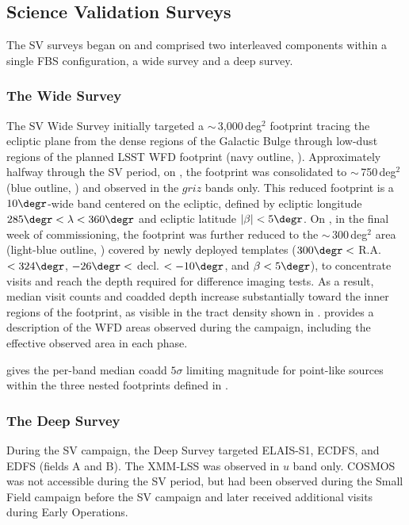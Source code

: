 \subsection{Science Validation Surveys}
\label{ssec:sv_surveys}
%
The \gls{SV} surveys began on \svcampaignstartdate and comprised two interleaved components within a single \gls{FBS} \gls{configuration}, a wide survey and a deep survey.

\subsubsection{The Wide Survey}
The SV Wide Survey initially targeted a $\sim$\,3,000\,deg$^2$ \gls{footprint} tracing the ecliptic plane from the dense regions of the Galactic Bulge through low-dust regions of the planned \gls{LSST} \gls{WFD} \gls{footprint} (navy outline, ).
Approximately halfway through the \gls{SV} period, on \svwfdsevenfiftystart, the \gls{footprint} was consolidated to $\sim$\,750\,deg$^2$ (blue outline, ) and observed in the $griz$ bands only.
This reduced \gls{footprint} is a $10\degr$-wide band centered on the ecliptic, defined by ecliptic longitude $285\degr < \lambda < 360\degr$ and ecliptic latitude $|\beta| < 5\degr$.
On \svwfdthreehundredstart, in the final week of commissioning, the \gls{footprint} was further reduced to the $\sim$\,300\,deg$^2$ area (light-blue outline, ) covered by newly deployed templates ($300\degr <$ R.A. $< 324\degr$, $-26\degr <$ decl. $< -10\degr$, and $\beta < 5\degr$), to concentrate visits and reach the depth required for difference imaging tests.
As a result, median visit counts and coadded depth increase substantially toward the inner regions of the \gls{footprint}, as visible in the tract density shown in .
 provides a description of the \gls{WFD} areas observed during the campaign, including the effective observed area in each phase.



 gives the per-band median coadd $5\sigma$ limiting magnitude for point-like sources within
the three nested footprints defined in .



\subsubsection{The Deep Survey}
During the \gls{SV} campaign, the Deep Survey targeted ELAIS-S1, \gls{ECDFS}, and \gls{EDFS} (fields A and \gls{B}).
The XMM-\gls{LSS} was observed in $u$ band only.
\gls{COSMOS} was not accessible during the \gls{SV} period, but had been observed during the Small Field campaign before the \gls{SV} campaign and later received additional visits during Early \gls{Operations}.

